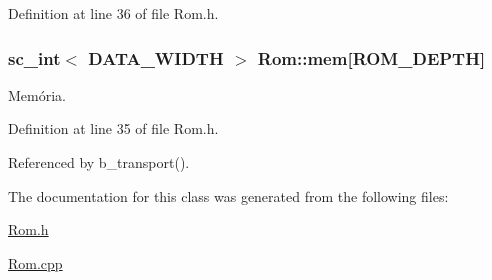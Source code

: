 Definition at line 36 of file Rom.\+h.

\hypertarget{classRom_af33d606aaf92751fe6b489b6c5fff4f4}{
\subsubsection[{mem}]{\setlength{\rightskip}{0pt plus 5cm}sc\+\_\+int$<$ {\bf D\+A\+T\+A\+\_\+\+W\+I\+D\+T\+H} $>$ Rom\+::mem\mbox{[}{\bf R\+O\+M\+\_\+\+D\+E\+P\+T\+H}\mbox{]}\hspace{0.3cm}{\ttfamily [private]}}}\label{classRom_af33d606aaf92751fe6b489b6c5fff4f4}
Memória. 

Definition at line 35 of file Rom.\+h.



Referenced by b\+\_\+transport().



The documentation for this class was generated from the following files\+:\begin{DoxyCompactItemize}
\item 
\hyperlink{Rom_8h}{Rom.\+h}\item 
\hyperlink{Rom_8cpp}{Rom.\+cpp}\end{DoxyCompactItemize}

